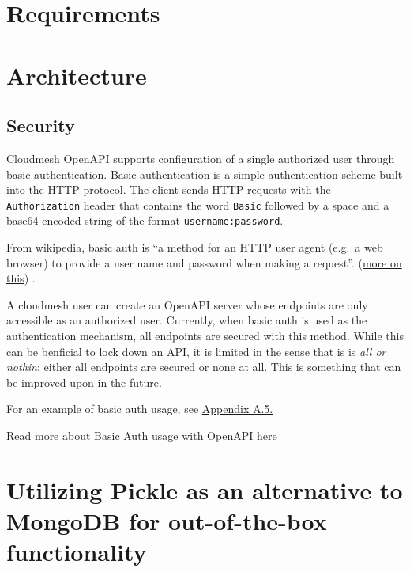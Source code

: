 \section{Requirements}
\label{sec:requirements}




\section{Architecture}
\label{sec:architecture}

\subsection{Security}
\label{security}

Cloudmesh OpenAPI supports configuration of a single authorized user
through basic authentication. Basic authentication is a simple
authentication scheme built into the HTTP protocol. The client sends
HTTP requests with the \verb|Authorization| header that contains the
word \verb|Basic| followed by a space and a base64-encoded string of
the format \verb|username:password|.

From wikipedia, basic auth is ``a method for an HTTP user agent (e.g.~a
web browser) to provide a user name and password when making a
request''. (\href{https://github.com/cloudmesh/cloudmesh-openapi}{more
on this}) \cite{cloudmesh-openapi}.

A cloudmesh user can create an OpenAPI server whose endpoints are only
accessible as an authorized user. Currently, when basic auth is used as
the authentication mechanism, all endpoints are secured with this
method. While this can be benficial to lock down an API, it is limited
in the sense that is is {\em all or nothin}: either all endpoints are
secured or none at all. This is something that can be improved upon in
the future.

For an example of basic auth usage, see
\protect\hyperlink{a5-basic-auth-example}{Appendix A.5.}

Read more about Basic Auth usage with OpenAPI
\href{https://swagger.io/docs/specification/authentication/basic-authentication/}{here}

\section{Utilizing Pickle as an alternative to MongoDB for
  out-of-the-box
  functionality}\label{utilizing-pickle-as-an-alternative-to-mongodb-for-out-of-the-box-functionality}

